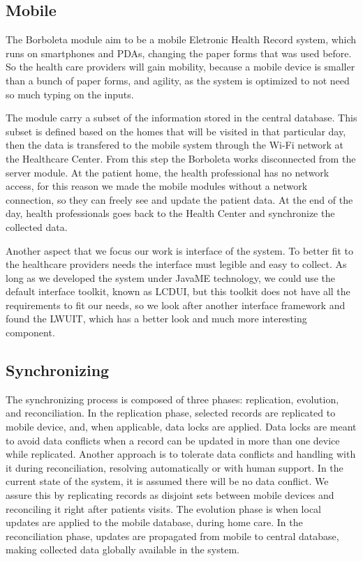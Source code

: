 \documentclass[12pt]{article}
\begin{document}
\subsection{Mobile}
The Borboleta module \cite{correia08} aim to be a mobile Eletronic Health Record system, which runs on smartphones and PDAs, changing the paper forms that was used before. So the health care providers will gain mobility, because a mobile device is smaller than a bunch of paper forms, and agility, as the system is optimized to not need so much typing on the inputs.

The module carry a subset of the information stored in the central database. This subset is defined based on the homes that will be visited in that particular day, then the data is transfered to the mobile system through the Wi-Fi network at the Healthcare Center. From this step the Borboleta works disconnected from the server module. At the patient home, the health professional has no network access, for this reason we made the mobile modules without a network connection, so they can freely see and update the patient data. At the end of the day, health professionals goes back to the Health Center and synchronize the collected data.

Another aspect that we focus our work is interface of the system. To better fit to the healthcare providers needs the interface must legible and easy to collect. As long as we developed the system under JavaME technology, we could use the default interface toolkit, known as LCDUI, but this toolkit does not have all the requirements to fit our needs, so we look after another interface framework and found the LWUIT, which has a better look and much more interesting component.

\subsection{Synchronizing}

The synchronizing process is composed of three phases: replication, evolution, and reconciliation. In the replication phase, selected records are replicated to mobile device, and, when applicable, data locks are applied. Data locks are meant to avoid data conflicts when a record can be updated in more than one device while replicated. Another approach is to tolerate data conflicts and handling with it during reconciliation, resolving automatically or with human support. In the current state of the system, it is assumed there will be no data conflict. We assure this by replicating records as disjoint sets between mobile devices and reconciling it right after patients visits. The evolution phase is when local updates are applied to the mobile database, during home care. In the reconciliation phase, updates are propagated from mobile to central database, making collected data globally available in the system. 
\end{document}
